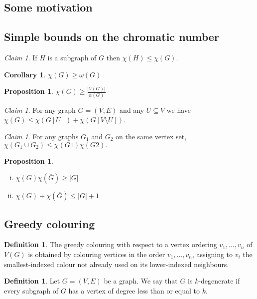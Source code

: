 \documentclass[10pt, fleqn, a4paper, landscape]{article}
\theoremstyle{plain} %
\newtheorem{pro}[thm]{Proposition}
\newtheorem{cor}[thm]{Corollary}
\theoremstyle{remark} %
\newtheorem{claim}[thm]{Claim}
\theoremstyle{definition} %
\newtheorem{defi}[thm]{Definition}
\begin{document}
\begin{multicols}{3}
\begin{tiny}
\subsection{Some motivation}
\addtocounter{thm}{1}\addtocounter{thm}{1}
\subsection{Simple bounds on the chromatic number}
\begin{claim}
If $H$ is a subgraph of $G$ then $\chi(H) \le \chi(G)$.
\end{claim}

\begin{cor}
$\chi(G) \ge \omega(G)$
\end{cor}
\addtocounter{thm}{1}
\begin{pro}
$\chi(G) \ge\frac{|V (G)|}{\alpha(G)}$
\end{pro}

\begin{claim}
For any graph $G = (V,E)$ and any $U \subseteq V$ we have $\chi(G) \le \chi(G[U]) + \chi(G[V \setminus U])$.
\end{claim}

\begin{claim}
For any graphs $G_1$ and $G_2$ on the same vertex set, $\chi(G_1 \cup G_2) \le \chi(G1)\chi(G2).$
\end{claim}


\begin{pro}
\begin{enumerate}[(i)]
\item $\chi(G)\chi(\overline{G})\ge |G|$
\item $\chi(G)+\chi(\overline{G})\le |G|+1$
\end{enumerate}
\end{pro}

\subsection{Greedy colouring}

\begin{defi}
The greedy colouring with respect to a vertex ordering $v_1, \dots , v_n$ of $V (G)$ is obtained by colouring vertices in the order $v_1, \dots , v_n$, assigning to $v_i$ the smallest-indexed colour not already used on its lower-indexed neighbours.
\end{defi}
\addtocounter{thm}{1}
\begin{defi}
Let $G = (V,E)$ be a graph. We say that $G$ is $k$-degenerate if every subgraph of $G$ has a vertex of degree less than or equal to $k$.
\end{defi}


\end{tiny}
\end{multicols}
\end{document}

